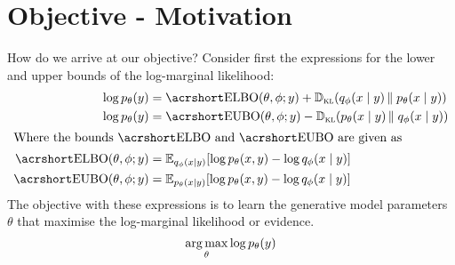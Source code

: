 
\section{Objective - Motivation}
\label{sec:mot}

How do we arrive at our objective?
%
Consider first the expressions for the lower and upper bounds of the
log-marginal likelihood:
%
\begin{align*}
  \log \p[\theta]{y}
  &=\fnP{\ELBO}{\theta, \phi; y} + \KL{\q[\phi]{x \given y}}{\p[\theta]{x \given y}}\\
  \log \p[\theta]{y}
  &=\fnP{\EUBO}{\theta, \phi; y} - \KL{\p[\theta]{x \given y}}{\q[\phi]{x \given y}}\\
  \intertext{Where the bounds \(\ELBO\) and \(\EUBO\) are given as}
  \fnP{\ELBO}{\theta, \phi; y}
  &=\Ex[{\q[\phi]{x \given y}}]{\log \p[\theta]{x, y} - \log \q[\phi]{x \given y}}\\
  \fnP{\EUBO}{\theta, \phi; y}
  &=\Ex[{\p[\theta]{x \given y}}]{\log \p[\theta]{x, y} - \log \q[\phi]{x \given y}}
\end{align*}
%
The objective with these expressions is to learn the generative model
parameters~\(\theta\) that maximise the log-marginal likelihood or evidence.
%
\[\argmax_{\theta} \log \p[\theta]{y} \]

